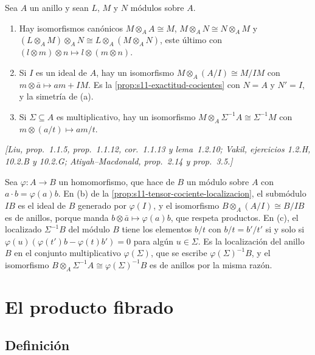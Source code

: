 \begin{prop}
\label{prop:s11-tensor-cociente-localizacion}
Sea \(A\) un anillo y sean \(L\), \(M\) y \(N\) módulos sobre \(A\).
\begin{enumerate}[label=(\alph*)]
\item Hay isomorfismos canónicos \(M\otimes_A A\cong M\), \(M\otimes_A N\cong N\otimes_A M\) y \((L\otimes_A M)\otimes_A N\cong L\otimes_A(M\otimes_A N)\), este último con \((l\otimes m)\otimes n\mapsto l\otimes(m\otimes n)\).
\item Si \(I\) es un ideal de \(A\), hay un isomorfismo \(M\otimes_A(A/I)\cong M/IM\) con \(m\otimes\bar a\mapsto am+IM\). Es la \cref{prop:s11-exactitud-cocientes} con \(N=A\) y \(N'=I\), y la simetría de (a).
\item Si \(\Sigma\subseteq A\) es multiplicativo, hay un isomorfismo \(M\otimes_A\Sigma^{-1}A\cong\Sigma^{-1}M\) con \(m\otimes(a/t)\mapsto am/t\).
\end{enumerate}
\emph{[Liu, prop.~1.1.5, prop.~1.1.12, cor.~1.1.13 y lema~1.2.10; Vakil, ejercicios 1.2.H, 10.2.B y 10.2.G; Atiyah--Macdonald, prop.~2.14 y prop.~3.5.]}
\end{prop}

\begin{obs}
\label{obs:s11-tensor-algebra}
Sea \(\varphi\colon A\to B\) un homomorfismo, que hace de \(B\) un módulo sobre \(A\) con \(a\cdot b=\varphi(a)b\). En (b) de la \cref{prop:s11-tensor-cociente-localizacion}, el submódulo \(IB\) es el ideal de \(B\) generado por \(\varphi(I)\), y el isomorfismo \(B\otimes_A(A/I)\cong B/IB\) es de anillos, porque manda \(b\otimes\bar a\mapsto\varphi(a)b\), que respeta productos. En (c), el localizado \(\Sigma^{-1}B\) del módulo \(B\) tiene los elementos \(b/t\) con \(b/t=b'/t'\) si y solo si \(\varphi(u)(\varphi(t')b-\varphi(t)b')=0\) para algún \(u\in\Sigma\). Es la localización del anillo \(B\) en el conjunto multiplicativo \(\varphi(\Sigma)\), que se escribe \(\varphi(\Sigma)^{-1}B\), y el isomorfismo \(B\otimes_A\Sigma^{-1}A\cong\varphi(\Sigma)^{-1}B\) es de anillos por la misma razón.
\end{obs}

\section{El producto fibrado}
\label{sec:s11-producto-fibrado}

\subsection{Definición}

